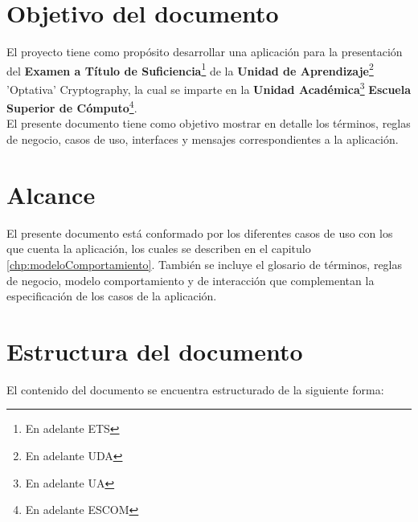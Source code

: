 \section{Objetivo del documento}\label{sec:objetivo}

El proyecto tiene como propósito desarrollar una aplicación para la presentación del  \textbf{Examen a Título de Suficiencia}\footnote{En adelante ETS} de la \textbf{Unidad de Aprendizaje}\footnote{En adelante UDA} 'Optativa' Cryptography, la cual se imparte en la \textbf{Unidad Académica}\footnote{En adelante UA} \textbf{Escuela Superior de Cómputo}\footnote{En adelante ESCOM}.\\

El presente documento tiene como objetivo mostrar en detalle los términos, reglas de negocio, casos de uso, interfaces y mensajes correspondientes a la aplicación.

\section{Alcance}\label{sec:alcance}

El presente documento está conformado por los diferentes casos de uso con los que cuenta la aplicación, los cuales se describen en el capitulo \ref{chp:modeloComportamiento}. También se incluye el glosario de términos, reglas de negocio, modelo comportamiento y de interacción que complementan la especificación de los casos de la aplicación.

\section{Estructura del documento}\label{sec:estructuraDocumento}

El contenido del documento se encuentra estructurado de la siguiente forma:\\

